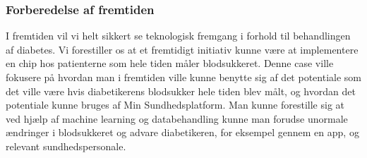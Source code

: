 \subsubsection{Forberedelse af fremtiden}
I fremtiden vil vi helt sikkert se teknologisk fremgang i forhold til behandlingen af diabetes. Vi forestiller os at et fremtidigt initiativ kunne være at implementere en chip hos patienterne som hele tiden måler blodsukkeret. Denne case ville fokusere på hvordan man i fremtiden ville kunne benytte sig af det potentiale som det ville være hvis diabetikerens blodsukker hele tiden blev målt, og hvordan det potentiale kunne bruges af Min Sundhedsplatform. Man kunne forestille sig at ved hjælp af machine learning og databehandling kunne man forudse unormale ændringer i blodsukkeret og advare diabetikeren, for eksempel gennem en app, og relevant sundhedspersonale.